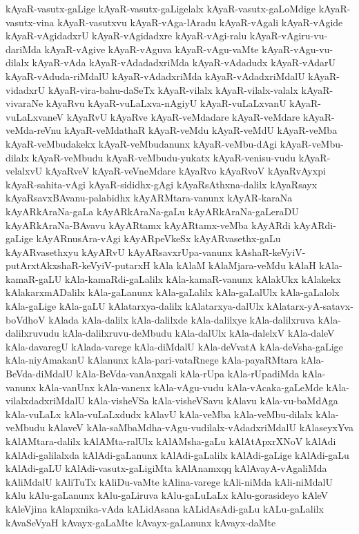 {kAyaR-vasutx-gaLige
kAyaR-vasutx-gaLigelalx
kAyaR-vasutx-gaLoMdige
kAyaR-vasutx-vina
kAyaR-vasutxvu
kAyaR-vAga-lAradu
kAyaR-vAgali
kAyaR-vAgide
kAyaR-vAgidadxrU
kAyaR-vAgidadxre
kAyaR-vAgi-ralu
kAyaR-vAgiru-vu-dariMda
kAyaR-vAgive
kAyaR-vAguva
kAyaR-vAgu-vaMte
kAyaR-vAgu-vu-dilalx
kAyaR-vAda
kAyaR-vAdadadxriMda
kAyaR-vAdadudx
kAyaR-vAdarU
kAyaR-vAduda-riMdalU
kAyaR-vAdadxriMda
kAyaR-vAdadxriMdalU
kAyaR-vidadxrU
kAyaR-vira-bahu-daSeTx
kAyaR-vilalx
kAyaR-vilalx-valalx
kAyaR-vivaraNe
kAyaRvu
kAyaR-vuLaLxva-nAgiyU
kAyaR-vuLaLxvanU
kAyaR-vuLaLxvaneV
kAyaRvU
kAyaRve
kAyaR-veMdadare
kAyaR-veMdare
kAyaR-veMda-reVnu
kAyaR-veMdathaR
kAyaR-veMdu
kAyaR-veMdU
kAyaR-veMba
kAyaR-veMbudakekx
kAyaR-veMbudanunx
kAyaR-veMbu-dAgi
kAyaR-veMbu-dilalx
kAyaR-veMbudu
kAyaR-veMbudu-yukatx
kAyaR-venisu-vudu
kAyaR-velalxvU
kAyaRveV
kAyaR-veVneMdare
kAyaRvo
kAyaRvoV
kAyaRvAyxpi
kAyaR-sahita-vAgi
kAyaR-sididhx-gAgi
kAyaRsAthxna-dalilx
kAyaRsayx
kAyaRsavxBAvanu-palabidhx
kAyARMtara-vanunx
kAyAR-karaNa
kAyARkAraNa-gaLa
kAyARkAraNa-gaLu
kAyARkAraNa-gaLeraDU
kAyARkAraNa-BAvavu
kAyARtamx
kAyARtamx-veMba
kAyARdi
kAyARdi-gaLige
kAyARnusAra-vAgi
kAyARpeVkeSx
kAyARvasethx-gaLu
kAyARvasethxyu
kAyARvU
kAyARsavxrUpa-vanunx
kAshaR-keVyiV-putArxtAkxshaR-keVyiV-putarxH
kAla
kAlaM
kAlaMjara-veMdu
kAlaH
kAla-kamaR-gaLU
kAla-kamaRdi-gaLalilx
kAla-kamaR-vanunx
kAlakUkx
kAlakekx
kAlakarxmADalilx
kAla-gaLanunx
kAla-gaLalilx
kAla-gaLalUlx
kAla-gaLalolx
kAla-gaLige
kAla-gaLU
kAlatarxya-dalilx
kAlatarxya-dalUlx
kAlatarx-yA-satavx-boVdhoV
kAlada
kAla-dalilx
kAla-dalilxde
kAla-dalilxye
kAla-dalilxruva
kAla-dalilxruvudu
kAla-dalilxruvu-deMbudu
kAla-dalUlx
kAla-dalelxV
kAla-daleV
kAla-davaregU
kAlada-varege
kAla-diMdalU
kAla-deVvatA
kAla-deVsha-gaLige
kAla-niyAmakanU
kAlanunx
kAla-pari-vataRnege
kAla-payaRMtara
kAla-BeVda-diMdalU
kAla-BeVda-vanAnxgali
kAla-rUpa
kAla-rUpadiMda
kAla-vanunx
kAla-vanUnx
kAla-vanenx
kAla-vAgu-vudu
kAla-vAcaka-gaLeMde
kAla-vilalxdadxriMdalU
kAla-visheVSa
kAla-visheVSavu
kAlavu
kAla-vu-baMdAga
kAla-vuLaLx
kAla-vuLaLxdudx
kAlavU
kAla-veMba
kAla-veMbu-dilalx
kAla-veMbudu
kAlaveV
kAla-saMbaMdha-vAgu-vudilalx-vAdadxriMdalU
kAlaseyxYva
kAlAMtara-dalilx
kAlAMta-ralUlx
kAlAMsha-gaLu
kAlAtApxrXNoV
kAlAdi
kAlAdi-galilalxda
kAlAdi-gaLanunx
kAlAdi-gaLalilx
kAlAdi-gaLige
kAlAdi-gaLu
kAlAdi-gaLU
kAlAdi-vasutx-gaLigiMta
kAlAnamxqq
kAlAvayA-vAgaliMda
kAliMdalU
kAliTuTx
kAliDu-vaMte
kAlina-varege
kAli-niMda
kAli-niMdalU
kAlu
kAlu-gaLanunx
kAlu-gaLiruva
kAlu-gaLuLaLx
kAlu-gorasideyo
kAleV
kAleVjina
kAlapxnika-vAda
kALidAsana
kALidAsAdi-gaLu
kALu-gaLalilx
kAvaSeVyaH
kAvayx-gaLaMte
kAvayx-gaLanunx
kAvayx-daMte
}
